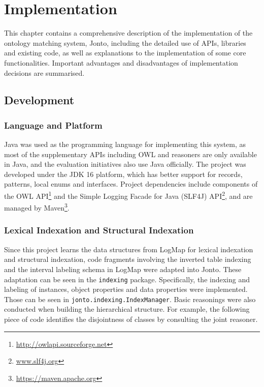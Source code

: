 \chapter{Implementation}



This chapter contains a comprehensive description of the implementation of the ontology matching system, Jonto, including the detailed use of APIs, libraries and existing code, as well as explanations to the implementation of some core functionalities. Important advantages and disadvantages of implementation decisions are summarised.

\section{Development}

\subsection{Language and Platform}

Java was used as the programming language for implementing this system, as most of the supplementary APIs including OWL and reasoners are only available in Java, and the evaluation initiatives also use Java officially. The project was developed under the JDK 16 platform, which has better support for records, patterns, local enums and interfaces. Project dependencies include components of the OWL API\footnote{\url{http://owlapi.sourceforge.net}} and the Simple Logging Facade for Java (SLF4J) API\footnote{\url{www.slf4j.org}}, and are managed by Maven\footnote{\url{https://maven.apache.org}}.

\subsection{Lexical Indexation and Structural Indexation}

Since this project learns the data structures from LogMap for lexical indexation and structural indexation, code fragments involving the inverted table indexing and the interval labeling schema in LogMap were adapted into Jonto. These adaptation can be seen in the \texttt{indexing} package. Specifically, the indexing and labeling of instances, object properties and data properties were implemented. Those can be seen in \texttt{jonto.indexing.IndexManager}. Basic reasonings were also conducted when building the hierarchical structure. For example, the following piece of code identifies the disjointness of classes by consulting the joint reasoner.


